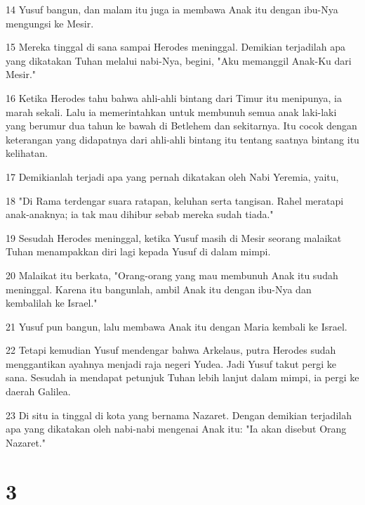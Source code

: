 \par 14 Yusuf bangun, dan malam itu juga ia membawa Anak itu dengan ibu-Nya mengungsi ke Mesir.
\par 15 Mereka tinggal di sana sampai Herodes meninggal. Demikian terjadilah apa yang dikatakan Tuhan melalui nabi-Nya, begini, "Aku memanggil Anak-Ku dari Mesir."
\par 16 Ketika Herodes tahu bahwa ahli-ahli bintang dari Timur itu menipunya, ia marah sekali. Lalu ia memerintahkan untuk membunuh semua anak laki-laki yang berumur dua tahun ke bawah di Betlehem dan sekitarnya. Itu cocok dengan keterangan yang didapatnya dari ahli-ahli bintang itu tentang saatnya bintang itu kelihatan.
\par 17 Demikianlah terjadi apa yang pernah dikatakan oleh Nabi Yeremia, yaitu,
\par 18 "Di Rama terdengar suara ratapan, keluhan serta tangisan. Rahel meratapi anak-anaknya; ia tak mau dihibur sebab mereka sudah tiada."
\par 19 Sesudah Herodes meninggal, ketika Yusuf masih di Mesir seorang malaikat Tuhan menampakkan diri lagi kepada Yusuf di dalam mimpi.
\par 20 Malaikat itu berkata, "Orang-orang yang mau membunuh Anak itu sudah meninggal. Karena itu bangunlah, ambil Anak itu dengan ibu-Nya dan kembalilah ke Israel."
\par 21 Yusuf pun bangun, lalu membawa Anak itu dengan Maria kembali ke Israel.
\par 22 Tetapi kemudian Yusuf mendengar bahwa Arkelaus, putra Herodes sudah menggantikan ayahnya menjadi raja negeri Yudea. Jadi Yusuf takut pergi ke sana. Sesudah ia mendapat petunjuk Tuhan lebih lanjut dalam mimpi, ia pergi ke daerah Galilea.
\par 23 Di situ ia tinggal di kota yang bernama Nazaret. Dengan demikian terjadilah apa yang dikatakan oleh nabi-nabi mengenai Anak itu: "Ia akan disebut Orang Nazaret."

\chapter{3}

